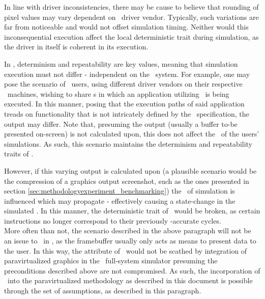 In line with driver inconsistencies, there may be cause to believe that rounding of pixel values may vary dependent on \dvttermhost\ driver vendor.
Typically, such variations are far from noticeable and would not offset simulation timing.
Neither would this inconsequential execution affect the local deterministic trait during simulation, as the driver in itself is coherent in its execution.

In \dvttermsimics , determinism and repeatability are key values, meaning that simulation execution must not differ - independent on the \dvttermhost\ system.
For example, one may pose the scenario of \dvttermsimics\ users, using different driver vendors on their respective \dvttermhost\ machines, wishing to share \dvttermcheckpoint s in which an application utilizing \dvttermopengles\ is being executed.
In this manner, posing that the execution paths of said application treads on functionality that is not intricately defined by the \dvttermopengles\ specification, the output may differ.
Note that, presuming the output (usually a buffer to-be presented on-screen) is not calculated upon, this does not affect the \dvttermtiming\ of the users' simulations.
As such, this scenario maintains the determinism and repeatability traits of \dvttermsimics .

However, if this varying output is calculated upon (a plausible scenario would be the compression of a graphics output screenshot, such as the ones presented in section \ref{sec:methodologyexperiment_benchmarking}) the \dvttermtiming\ of simulation is influenced which may propagate - effectively causing a state-change in the simulated \dvttermcpu .
In this manner, the deterministic trait of \dvttermsimics\ would be broken, as certain instructions no longer correspond to their previously \dvttermtiming -accurate cycles.\\

\noindent
More often than not, the scenario described in the above paragraph will not be an issue to \dvttermdeterministicexecution\ in \dvttermsimics , as the framebuffer usually only acts as means to present data to the user.
In this way, the attribute of \dvttermdeterministicexecution\ would not be scathed by integration of paravirtualized graphics in the \dvttermsimics\ full-system simulator presuming the preconditions described above are not compromised.
As such, the incorporation of \dvttermdeterministicexecution\ into the paravirtualized methodology as described in this document is possible through the set of assumptions, as described in this paragraph.

